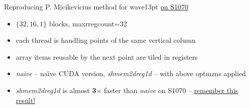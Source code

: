 \documentclass[aspectratio=169]{beamer}
\begin{document}
\begin{frame}[fragile,t]{Reproducing P. Micikevicius method for wave13pt \underline{on S1070}}

\begin{minipage}[t][2.5cm]{\textwidth}
\begin{itemize}
\item $\{32, 16, 1\}$ blocks, maxrregcount=32
\item each thread is handling points of the same vertical column
\item array items reusable by the next point are tiled in registers
\item \emph{naive} -- na\"{i}ve CUDA version, \emph{shmem2dreg1d} -- with above optmzns applied
\item \emph{shmem2dreg1d} is almost \textbf{3$\times$} faster than \emph{naive} on S1070 -- \underline{remember this result!}
\end{itemize}
\end{minipage}

%
\end{frame}
\end{document}
